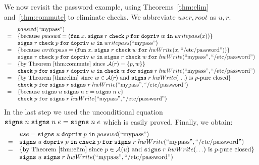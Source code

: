 \documentclass[submission,copyright,creativecommons]{eptcs}
\newcommand{\enable}[2]{\ENABLE\;#1\;\IN\;#2}
\newcommand{\chk}[2]{\CHK\;#1\;\FOR\;#2}
\newcommand{\signs}[2]{\SIGNS\;#1\;#2}
\newcommand{\FOR}{\mbox{\texttt{for}}}
\newcommand{\IN}{\mbox{\texttt{in}}}
\newcommand{\A}{\mathcal{A}}
\newcommand{\ENABLE}{\mbox{\texttt{dopriv}}}
\newcommand{\CHK}{\mbox{\texttt{check}}}
\newcommand{\SIGNS}{\mbox{\texttt{signs}}}
\newcommand{\LAM}[2]{{\mathtt{fun}\; #1.\; #2}}
\newcommand{\n}{n} \newcommand{\p}{p} \newcommand{\Ps}{\Pi} \newcommand{\h}{h}
\begin{document}
We now revisit the password example, using Theorems~\ref{thm:elim} and~\ref{thm:commute} to eliminate checks.
We abbreviate $user,root$ as $u,r$.
\[\begin{array}{cll}
& passwd(\mbox{``mypass''}) \\
=& \{\mbox{because }passwd=(\LAM{x}{\signs{r}{\chk{p}{\enable{w}{writepass(x)}}}})\}\\
& \signs{r}{\chk{p}{\enable{w}{writepass(\mbox{``mypass''})}}}  \\
=& \{\mbox{because }writepass=(\LAM{x}{\signs{r}{\chk{w}{hwWrite(x,\mbox{``/etc/password''})}}})\}\\
& \signs{r}{\chk{p}{\enable{w}{
    \signs{r}{\chk{w}{hwWrite(\mbox{``mypass''},\mbox{``/etc/password''})}}}}} \\
=&\{\mbox{by Theorem~\ref{thm:commute} since }\A(r)=\{p,w\}\}\\
 &\chk{p}{\signs{r}
                 {\enable{w}
                         {\chk{w}
                              {\signs{r}
                                     {hwWrite(\mbox{``mypass''},
                                              \mbox{``/etc/password''})}}}}}\\
=&\{\mbox{by Theorem~\ref{thm:elim} since $w\in\A(r)$ and }
    \signs{r}{hwWrite(\ldots)}
    \mbox{ is $\p$-pure closed}\}\\
&\chk{\p}{\signs{r}
           \signs{r}{hwWrite(\mbox{``mypass''},\mbox{``/etc/password''})}}\\
=&\{\mbox{because }\signs{\n}{\signs{\n}{e}}=\signs{\n}{e}\}\\
&\chk{\p}{\signs{r}{hwWrite(\mbox{``mypass''},\mbox{``/etc/password''})}}
\end{array}
\]
In the last step we used the unconditional equation $\signs{\n}{\signs{\n}{e}}=\signs{\n}{e}$ which is easily proved.
Finally, we obtain:
\[
\begin{array}{cll}
& use=\signs{u}{\enable{\p}{passwd(\mbox{``mypass''})}}\\
=&\signs{u}{\enable{\p}{\chk{\p}
                        \signs{r}{hwWrite(\mbox{``mypass''},
                                          \mbox{``/etc/password''})}}}\\
=&\{\mbox{by Theorem~\ref{thm:elim} since $\p\in\A(u)$ and }
    \signs{r}{hwWrite(\ldots)}
    \mbox{ is $\p$-pure closed}\}\\
&\signs{u}{\signs{r}{hwWrite(\mbox{``mypass''},\mbox{``/etc/password''})}}
\end{array}
\]
\end{document}
